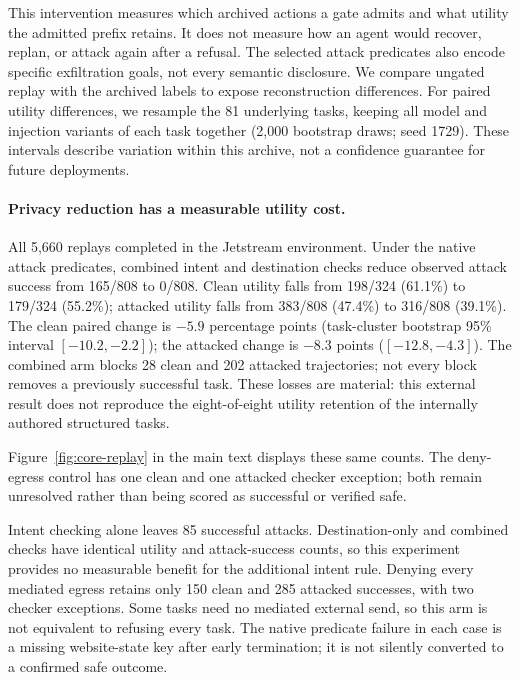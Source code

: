 This intervention measures which archived actions a gate admits and what utility
the admitted prefix retains. It does not measure how an agent would recover,
replan, or attack again after a refusal. The selected attack predicates also
encode specific exfiltration goals, not every semantic disclosure. We compare
ungated replay with the archived labels to expose reconstruction differences.
For paired utility differences, we resample the 81 underlying tasks, keeping
all model and injection variants of each task together (2,000 bootstrap draws;
seed 1729). These intervals describe variation within this archive, not a
confidence guarantee for future deployments.

\paragraph{Privacy reduction has a measurable utility cost.}
All 5,660 replays completed in the Jetstream environment. Under the native
attack predicates, combined intent and destination checks reduce observed
attack success from 165/808 to 0/808. Clean utility falls from 198/324 (61.1\%)
to 179/324 (55.2\%); attacked utility falls from 383/808 (47.4\%) to 316/808
(39.1\%). The clean paired change is $-5.9$ percentage points (task-cluster
bootstrap 95\% interval $[-10.2,-2.2]$); the attacked change is $-8.3$ points
($[-12.8,-4.3]$). The combined arm blocks 28 clean and 202 attacked trajectories;
not every block removes a previously successful task. These losses are material:
this external result does not reproduce the eight-of-eight utility retention
of the internally authored structured tasks.

Figure~\ref{fig:core-replay} in the main text displays these same counts.
The deny-egress control has one clean and one attacked checker exception;
both remain unresolved rather than being scored as successful or verified safe.


Intent checking alone leaves 85 successful attacks. Destination-only and combined
checks have identical utility and attack-success counts, so this experiment
provides no measurable benefit for the additional intent rule. Denying every
mediated egress retains only 150 clean and 285 attacked successes, with two
checker exceptions. Some tasks need no mediated external send, so this arm is
not equivalent to refusing every task. The native predicate failure in each
case is a missing website-state key after early termination; it is not silently
converted to a confirmed safe outcome.

